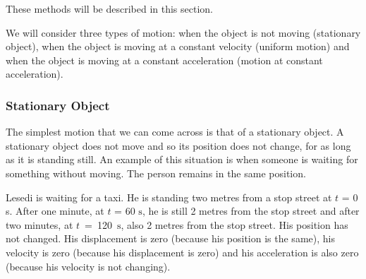       \label{m38795*id68997}These methods will be described in this section.\par 
      \label{m38795*id69001}We will consider three types of motion: when the object is not moving (stationary object), when the object is moving at a constant velocity (uniform motion) and when the object is moving at a constant acceleration (motion at constant acceleration).\par 
      \label{m38795*uid87}
            \subsubsection{ Stationary Object}
            \nopagebreak
            
        
        \label{m38795*id69015}The simplest motion that we can come across is that of a stationary object. A stationary object does not move and so its position does not change, for as long as it is standing still.
An example of this situation is when someone is waiting for something without moving.
The person remains in the same position.\par 
        \label{m38795*id69021}Lesedi is waiting for a taxi. He is standing two metres from a stop street at \begin{math}t\end{math} = 0 s. After one minute, at \begin{math}t\end{math} = 60 \begin{math}\mathrm{s}\end{math}, he is still 2 metres from the stop street and after two minutes, at \begin{math}t\end{math}~=~120~\begin{math}\mathrm{s}\end{math}, also 2 metres from the stop street. His position has not changed. His displacement is zero (because his position is the same), his velocity is zero (because his displacement is zero) and his acceleration is also zero (because his velocity is not changing).\par 
        
    \setcounter{subfigure}{0}


